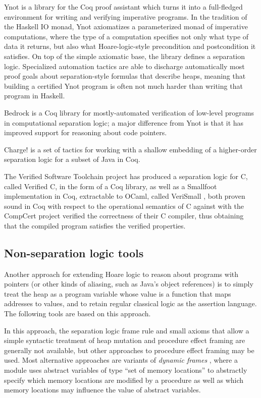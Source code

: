 \documentclass{CSML}
\theoremstyle{definition}\newtheorem{notation}[thm]{Notation}
\theoremstyle{plain}\newtheorem{satz}[thm]{Satz}
\begin{document}
Ynot \cite{DBLP:conf/icfp/ChlipalaMMSW09} is a library for the Coq proof assistant which turns it into a 
full-fledged environment for writing and verifying imperative programs. In 
the tradition of the Haskell IO monad, Ynot axiomatizes a parameterized 
monad of imperative computations, where the type of a computation specifies not only what type of data it returns, but also what Hoare-logic-style 
precondition and postcondition it satisfies. On top of the simple 
axiomatic base, the library defines a separation logic. Specialized 
automation tactics are able to discharge automatically most proof goals 
about separation-style formulas that describe heaps, meaning that building 
a certified Ynot program is often not much harder than writing that 
program in Haskell. 

Bedrock \cite{DBLP:conf/pldi/Chlipala11} is a Coq library for mostly-automated verification of low-level programs in computational separation logic; a major
difference from Ynot is that it has improved support for reasoning about code pointers.

Charge! \cite{charge} is a set of tactics for working with a shallow embedding of a higher-order separation logic for a subset of Java in Coq.

The Verified Software Toolchain project \cite{appel-verified-c-shakedown,vstbook,verified-software-toolchain-esop-2011} has produced a separation logic for C, called Verified C, in the form of a Coq library, as well as a Smallfoot implementation in Coq, extractable to OCaml, called VeriSmall \cite{verismall}, both proven sound in Coq with respect to the operational semantics of C against with the CompCert project \cite{Leroy-Compcert-CACM} verified the correctness of their C compiler, thus obtaining that the compiled program satisfies the verified properties.

\subsection{Non-separation logic tools}\enlargethispage{\baselineskip}

Another approach for extending Hoare logic to reason about programs with 
pointers (or other kinds of aliasing, such as Java's object references) is 
to simply treat the heap as a program variable whose value is a function 
that maps addresses to values, and to retain regular classical logic as 
the assertion language. The following tools are based on this approach. 

In this approach, the separation logic frame rule and small axioms that 
allow a simple syntactic treatment of heap mutation and procedure effect 
framing are generally not available, but other approaches to procedure 
effect framing may be used. Most alternative approaches are variants of 
\emph{dynamic frames} \cite{dynamic-frames}, where a module uses abstract 
variables of type ``set of memory locations'' to abstractly specify which 
memory locations are modified by a procedure as well as which memory 
locations may influence the value of abstract variables. 
\end{document}
